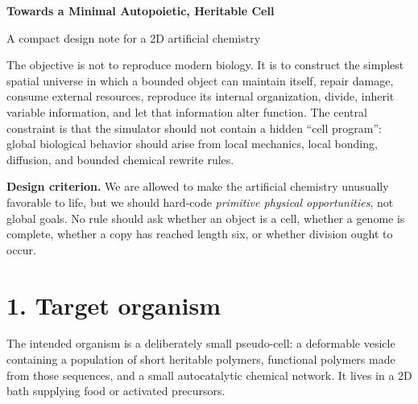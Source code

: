 \documentclass[10pt,a4paper]{article}
\begin{document}
\begin{center}
{\fontsize{22}{25}\selectfont\bfseries Towards a Minimal Autopoietic, Heritable Cell}\par
\vspace{2mm}
{\large\color{muted}A compact design note for a 2D artificial chemistry}\par
\vspace{3mm}
\begin{minipage}{0.92\textwidth}
\small
The objective is not to reproduce modern biology. It is to construct the simplest spatial universe in which a bounded object can maintain itself, repair damage, consume external resources, reproduce its internal organization, divide, inherit variable information, and let that information alter function. The central constraint is that the simulator should not contain a hidden ``cell program'': global biological behavior should arise from local mechanics, local bonding, diffusion, and bounded chemical rewrite rules.
\end{minipage}
\end{center}

\vspace{2mm}
\begin{principle}
\textbf{Design criterion.} We are allowed to make the artificial chemistry unusually favorable to life, but we should hard-code \emph{primitive physical opportunities}, not global goals. No rule should ask whether an object is a cell, whether a genome is complete, whether a copy has reached length six, or whether division ought to occur.
\end{principle}

\section{1. Target organism}

The intended organism is a deliberately small pseudo-cell: a deformable vesicle containing a population of short heritable polymers, functional polymers made from those sequences, and a small autocatalytic chemical network. It lives in a 2D bath supplying food or activated precursors.
\end{document}
